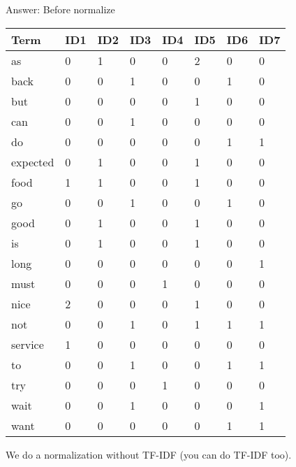 \documentclass[11pt,a4paper]{report}
\begin{document}
\begin{multicols*}{2}
\noindent Answer: Before normalize
\scriptsize
\begin{center}
\begin{tabular}{| l | l l l l l l l |}
\hline
Term     & ID1 & ID2 & ID3 & ID4 & ID5 & ID6 & ID7 \\ \hline
as       & 0   & 1   & 0   & 0   & 2   & 0   & 0   \\
back     & 0   & 0   & 1   & 0   & 0   & 1   & 0   \\
but      & 0   & 0   & 0   & 0   & 1   & 0   & 0   \\
can      & 0   & 0   & 1   & 0   & 0   & 0   & 0   \\
do       & 0   & 0   & 0   & 0   & 0   & 1   & 1   \\
expected & 0   & 1   & 0   & 0   & 1   & 0   & 0   \\
food     & 1   & 1   & 0   & 0   & 1   & 0   & 0   \\
go       & 0   & 0   & 1   & 0   & 0   & 1   & 0   \\
good     & 0   & 1   & 0   & 0   & 1   & 0   & 0   \\
is       & 0   & 1   & 0   & 0   & 1   & 0   & 0   \\
long     & 0   & 0   & 0   & 0   & 0   & 0   & 1   \\
must     & 0   & 0   & 0   & 1   & 0   & 0   & 0   \\
nice     & 2   & 0   & 0   & 0   & 1   & 0   & 0   \\
not      & 0   & 0   & 1   & 0   & 1   & 1   & 1   \\
service  & 1   & 0   & 0   & 0   & 0   & 0   & 0   \\
to       & 0   & 0   & 1   & 0   & 0   & 1   & 1   \\
try      & 0   & 0   & 0   & 1   & 0   & 0   & 0   \\
wait     & 0   & 0   & 1   & 0   & 0   & 0   & 1   \\
want     & 0   & 0   & 0   & 0   & 0   & 1   & 1   \\ \hline
\end{tabular}
\end{center}
\normalsize

\clearpage
\noindent We do a normalization without TF-IDF (you can do TF-IDF too).


\end{multicols*}
\end{document}
